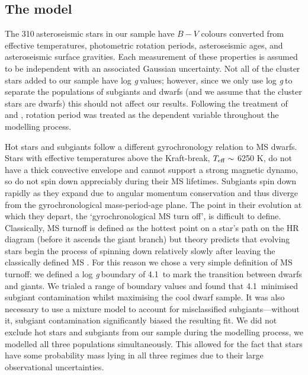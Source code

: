 \documentclass[useAMS, usenatbib]{mn2e}
\newcommand{\logg}{log \emph{g}}
\newcommand{\nastero}{310}
\newcommand{\subcut}{4.1~}
\begin{document}
\subsection{The model}

The \nastero$~$asteroseismic stars in our sample have $B-V$ colours converted
from effective temperatures, photometric rotation periods,
asteroseismic ages, and asteroseismic surface gravities.
Each measurement of these properties is assumed to be independent with an
associated Gaussian uncertainty.
Not all of the cluster stars added to our sample have \logg$~$values; however,
since we only use \logg$~$to separate the populations of subgiants and dwarfs
(and we assume that the cluster stars are dwarfs) this should not affect our
results.
Following the treatment of \citet{Barnes2007} and \citet{Mamajek2008},
rotation period was treated as the dependent variable throughout the modelling
process.

Hot stars and subgiants follow a different gyrochronology relation to MS
dwarfs.
Stars with effective temperatures above the Kraft-break, $T_{\rm{eff}}
\sim$ 6250 K, \citep{Kraft1967} do not have a thick convective envelope and
cannot support a strong magnetic dynamo, so do not spin down appreciably
during their MS lifetimes.
Subgiants spin down rapidly as they expand due to angular momentum
conservation and thus diverge from the gyrochronological mass-period-age
plane.
The point in their evolution at which they depart, the `gyrochronological MS
turn off', is difficult to define.
Classically, MS turnoff is defined as the hottest point on a star's path on
the HR diagram (before it ascends the giant branch) but theory predicts that
evolving stars begin the process of spinning down relatively slowly after
leaving the classically defined MS \citep{vanSaders2013}.
For this reason we chose a very simple definition of MS turnoff: we defined
a \logg$~$boundary of \subcut to mark the transition between dwarfs and
giants.
We trialed a range of boundary values and found that \subcut minimised subgiant
contamination whilst maximising the cool dwarf sample.
It was also necessary to use a mixture model to account for misclassified
subgiants---without it, subgiant contamination significantly biased the
resulting fit.
We did not exclude hot stars and subgiants from our sample during the
modelling process, we modelled all three populations simultaneously.
This allowed for the fact that stars have some probability mass lying in all
three regimes due to their large observational uncertainties.
\end{document}
